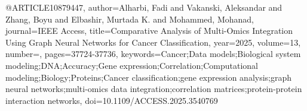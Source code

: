 @ARTICLE{10879447,
  author={Alharbi, Fadi and Vakanski, Aleksandar and Zhang, Boyu and Elbashir, Murtada K. and Mohammed, Mohanad},
  journal={IEEE Access}, 
  title={Comparative Analysis of Multi-Omics Integration Using Graph Neural Networks for Cancer Classification}, 
  year={2025},
  volume={13},
  number={},
  pages={37724-37736},
  keywords={Cancer;Data models;Biological system modeling;DNA;Accuracy;Gene expression;Correlation;Computational modeling;Biology;Proteins;Cancer classification;gene expression analysis;graph neural networks;multi-omics data integration;correlation matrices;protein-protein interaction networks},
  doi={10.1109/ACCESS.2025.3540769}}
